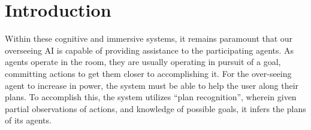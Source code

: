 \section{Introduction}

Within these cognitive and immersive systems, it remains paramount that
our overseeing AI is capable of providing assistance to the participating
agents. As agents operate in the room, they are usually operating in pursuit
of a goal, committing actions to get them closer to accomplishing it. For
the over-seeing agent to increase in power, the system must be able to help
the user along their plans. To accomplish this, the system utilizes ``plan
recognition'', wherein given partial observations of actions, and knowledge
of possible goals, it infers the plans of its agents.
